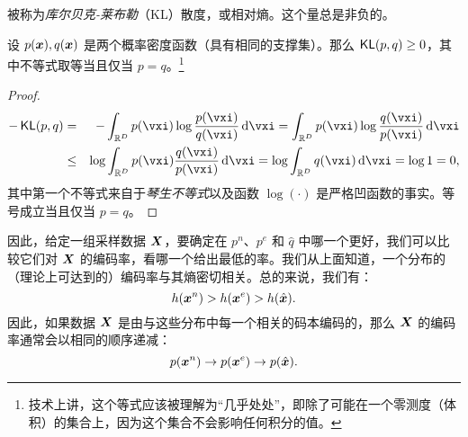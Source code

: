 \documentclass[../../book-main.tex]{subfiles}
\begin{document}
被称为{\em 库尔贝克-莱布勒}（KL）散度，或相对熵。这个量总是非负的。
\begin{theorem}[信息不等式]\label{thm:information-inequality}
	设 $p(\bm{x}), q(\bm{x})$ 是两个概率密度函数（具有相同的支撑集）。那么 $\operatorname{\mathsf{KL}}(p, q) \ge 0$，其中不等式取等当且仅当 $p = q$。\footnote{技术上讲，这个等式应该被理解为“几乎处处”，即除了可能在一个零测度（体积）的集合上，因为这个集合不会影响任何积分的值。}
\end{theorem}
\begin{proof}
	\begin{eqnarray*}
		- \KL(p, q)
		&=& - \int_{\R^{D}} p(\vxi) \log \frac{p(\vxi)}{q(\vxi)} \odif{\vxi}
		=  \int_{\R^{D}} p(\vxi) \log \frac{q(\vxi)}{p(\vxi)} \odif{\vxi} \\
		&\le& \log \int_{\R^{D}} p(\vxi)  \frac{q(\vxi)}{p(\vxi)} \odif{\vxi} \label{eqn:jensen-KL}
		= \log \int_{\R^{D}} q(\vxi) \odif{\vxi} = \log 1 = 0,
	\end{eqnarray*}
	其中第一个不等式来自于{\em 琴生不等式}以及函数 $\log(\cdot)$ 是严格凹函数的事实。等号成立当且仅当 $p = q$。
\end{proof}

因此，给定一组采样数据 $\bm{X}$，要确定在 $p^{n}$、$p^{e}$ 和 $\hat{q}$ 中哪一个更好，我们可以比较它们对 $\bm{X}$ 的编码率，看哪一个给出最低的率。我们从上面知道，一个分布的（理论上可达到的）编码率与其熵密切相关。总的来说，我们有：
\begin{equation}
	h(\bm{x}^n) > h(\bm{x}^e) > h(\hat {\bm{x}}).
\end{equation}
因此，如果数据 $\bm{X}$ 是由与这些分布中每一个相关的码本编码的，那么 $\bm{X}$ 的编码率通常会以相同的顺序递减：
\begin{equation}
	p(\bm{x}^n) \rightarrow p(\bm{x}^e) \rightarrow p(\hat {\bm{x}}).
\end{equation}
\end{document}
